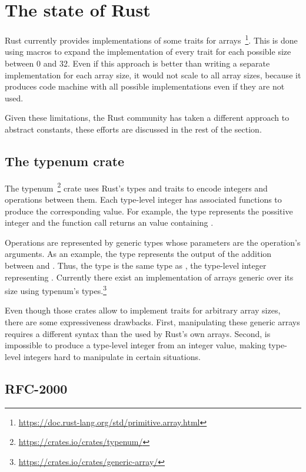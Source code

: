 \section{The state of Rust} 

Rust currently provides implementations of some traits for
arrays~\footnote{\url{https://doc.rust-lang.org/std/primitive.array.html}}.
This is done using macros to expand the implementation of every trait for each
possible size between 0 and 32. Even if this approach is better than writing a
separate implementation for each array size, it would not scale to all array
sizes, because it produces code machine with all possible implementations even
if they are not used.

Given these limitations, the Rust community has taken a different approach to
abstract constants, these efforts are discussed in the rest of the section.

\subsection{The typenum crate}

The typenum~\footnote{\url{https://crates.io/crates/typenum/}} crate uses Rust's
types and traits to encode integers and operations between them. Each type-level
integer has associated functions to produce the corresponding value. For
example, the type  represents the possitive integer  and
the function call  returns an  value
containing . 

Operations are represented by generic types whose parameters are the operation's
arguments. As an example, the type  represents the output of
the addition between  and . Thus, the type
 is the same type as , the type-level integer
representing . Currently there exist an implementation of arrays
generic over its size using typenum's
types.\footnote{\url{https://crates.io/crates/generic-array/}}

Even though those crates allow to implement traits for arbitrary array sizes,
there are some expressiveness drawbacks. First, manipulating these generic
arrays requires a different syntax than the used by Rust's own arrays. Second,
is impossible to produce a type-level integer from an integer value, making
type-level integers hard to manipulate in certain situations.

\subsection{RFC-2000} 
\label{subsec:rfc2000}

